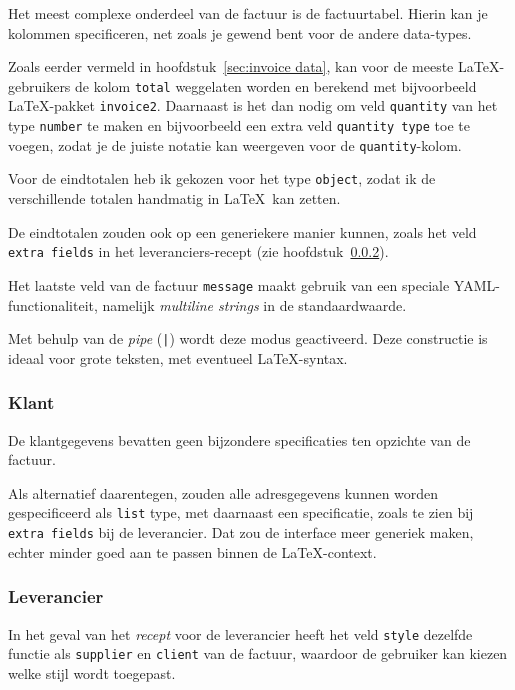 Het meest complexe onderdeel van de factuur is de factuurtabel.
Hierin kan je kolommen specificeren, net zoals je gewend bent voor de andere data-types.

Zoals eerder vermeld in hoofdstuk~\ref{sec:invoice data}, kan voor de meeste \LaTeX-gebruikers de kolom \texttt{total} weggelaten worden en berekend met bijvoorbeeld \LaTeX-pakket \texttt{invoice2}.
Daarnaast is het dan nodig om veld \texttt{quantity} van het type \texttt{number} te maken en bijvoorbeeld een extra veld \texttt{quantity type} toe te voegen, zodat je de juiste notatie kan weergeven voor de \texttt{quantity}-kolom.

Voor de eindtotalen heb ik gekozen voor het type \texttt{object}, zodat ik de verschillende totalen handmatig in \LaTeX\ kan zetten.

De eindtotalen zouden ook op een generiekere manier kunnen, zoals het veld \texttt{extra fields} in het leveranciers-recept (zie hoofdstuk~\ref{sec:supplier spec}).


Het laatste veld van de factuur \texttt{message} maakt gebruik van een speciale YAML-functionaliteit, namelijk \textit{multiline strings} in de standaardwaarde.

Met behulp van de \textit{pipe} (\texttt{|}) wordt deze modus geactiveerd.
Deze constructie is ideaal voor grote teksten, met eventueel \LaTeX-syntax.

\subsubsection{Klant}
De klantgegevens bevatten geen bijzondere specificaties ten opzichte van de factuur.

Als alternatief daarentegen, zouden alle adresgegevens kunnen worden gespecificeerd als \texttt{list} type, met daarnaast een specificatie, zoals te zien bij \texttt{extra fields} bij de leverancier.
Dat zou de interface meer generiek maken, echter minder goed aan te passen binnen de \LaTeX-context.

\subsubsection{Leverancier}\label{sec:supplier spec}
In het geval van het \textit{recept} voor de leverancier heeft het veld \texttt{style} dezelfde functie als \texttt{supplier} en \texttt{client} van de factuur, waardoor de gebruiker kan kiezen welke stijl wordt toegepast.


